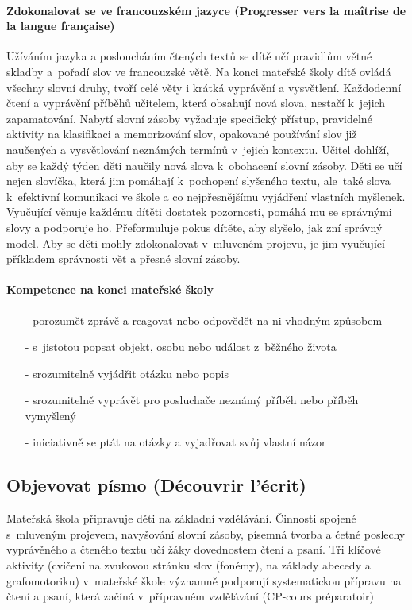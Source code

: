 			\paragraph{Zdokonalovat se ve francouzském jazyce (Progresser vers la maîtrise de la langue française)}
			Užíváním jazyka a posloucháním čtených textů se dítě učí pravidlům větné skladby a pořadí slov ve francouzské větě. Na konci mateřské školy dítě ovládá všechny slovní druhy, tvoří celé věty i krátká vyprávění a vysvětlení. Každodenní čtení a vyprávění příběhů učitelem, která obsahují nová slova, nestačí k jejich zapamatování. Nabytí slovní zásoby vyžaduje specifický přístup, pravidelné aktivity na klasifikaci a memorizování slov, opakované používání slov již naučených a vysvětlování neznámých termínů v jejich kontextu. Učitel dohlíží, aby se každý týden děti naučily nová slova k obohacení slovní zásoby. Děti se učí nejen slovíčka, která jim pomáhají k pochopení slyšeného textu, ale také slova k efektivní komunikaci ve škole a co nejpřesnějšímu vyjádření vlastních myšlenek. Vyučující věnuje každému dítěti dostatek pozornosti, pomáhá mu se správnými slovy a podporuje ho. Přeformuluje pokus dítěte, aby slyšelo, jak zní správný model. Aby se děti mohly zdokonalovat v mluveném projevu, je jim vyučující příkladem správnosti vět a přesné slovní zásoby.

			\paragraph{Kompetence na konci mateřské školy}
			\begin{itemize}
				\setlength\itemsep{-2mm}
				\item[-] porozumět zprávě a reagovat nebo odpovědět na ni vhodným způsobem
				\item[-] s jistotou popsat objekt, osobu nebo událost z běžného života
				\item[-] srozumitelně vyjádřit otázku nebo popis
				\item[-] srozumitelně vyprávět pro posluchače neznámý příběh nebo příběh vymyšlený 
				\item[-] iniciativně se ptát na otázky a vyjadřovat svůj vlastní názor
			\end{itemize}


		\subsection{Objevovat písmo (Découvrir l'écrit)}
			Mateřská škola připravuje děti na základní vzdělávání. Činnosti spojené s mluveným projevem, navyšování slovní zásoby, písemná tvorba a četné poslechy vyprávěného a čteného textu učí žáky dovednostem čtení a psaní. Tři klíčové aktivity (cvičení na zvukovou stránku slov (fonémy), na základy abecedy a grafomotoriku) v mateřské škole významně podporují systematickou přípravu na čtení a psaní, která začíná v přípravném vzdělávání (CP-cours préparatoir)

